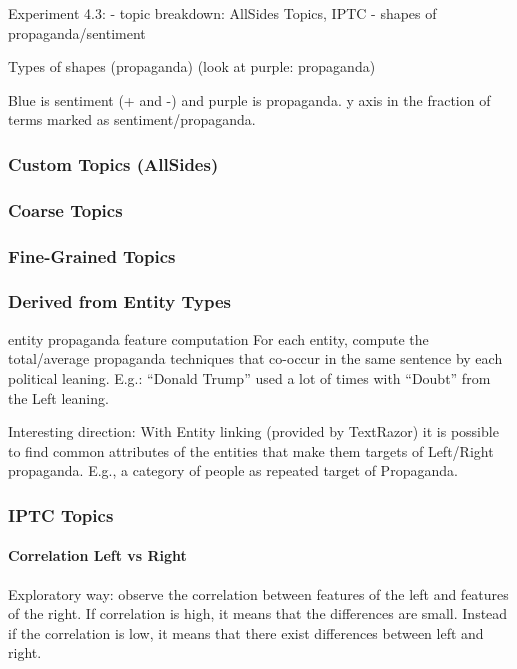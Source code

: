 Experiment 4.3: 
- topic breakdown: AllSides Topics, IPTC
- shapes of propaganda/sentiment


Types of shapes (propaganda)
(look at purple: propaganda)

Blue is sentiment (+ and -) and purple is propaganda. 
y axis in the fraction of terms marked as sentiment/propaganda.

\subsubsection{Custom Topics (AllSides)}

\subsubsection{Coarse Topics}

\subsubsection{Fine-Grained Topics}

\subsubsection{Derived from Entity Types}

entity propaganda feature computation
For each entity, compute the total/average propaganda techniques that co-occur in the same sentence by each political leaning. E.g.: “Donald Trump” used a lot of times with “Doubt” from the Left leaning.

Interesting direction:
With Entity linking (provided by TextRazor) it is possible to find common attributes of the entities that make them targets of Left/Right propaganda. E.g., a category of people as repeated target of Propaganda.

\subsubsection{IPTC Topics}

\paragraph{Correlation Left vs Right}
Exploratory way: observe the correlation between features of the left and features of the right. If correlation is high, it means that the differences are small. Instead if the correlation is low, it means that there exist differences between left and right.


